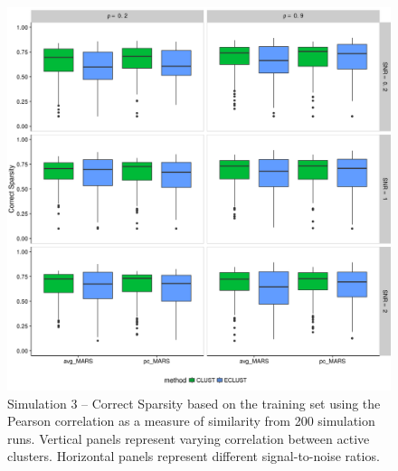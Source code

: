 \begin{figure}[H]
	\centering
	\includegraphics[scale=0.6, keepaspectratio]{./figs/hydra/results/figures/sim3-sept27/CorrectSparsity_Correlation_sim3.png}
	\caption{Simulation 3 -- Correct Sparsity based on the training set using the Pearson correlation as a measure of similarity from 200 simulation runs. Vertical panels represent varying correlation between active clusters. Horizontal panels represent different signal-to-noise ratios.}
	\label{fig:CorrectSparsity_Correlation_sim3}
\end{figure}


